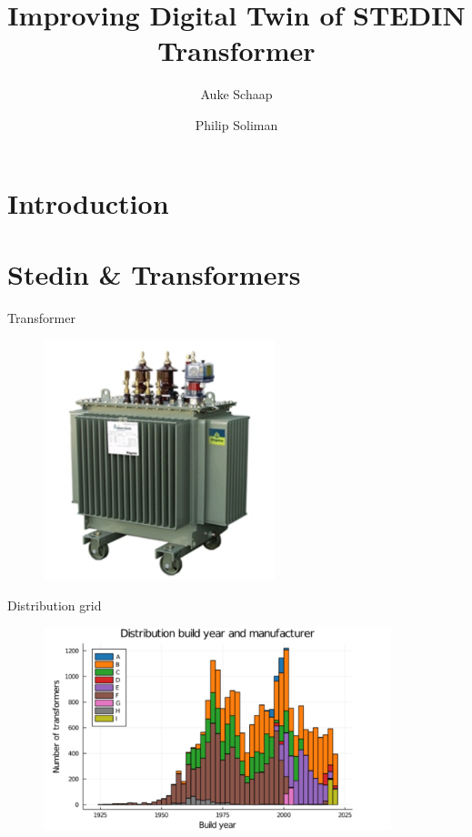 \documentclass[aspectratio=43]{beamer}
\title[]{Improving Digital Twin of STEDIN Transformer}
\institute[]{Delft University of Technology, The Netherlands}
\author{Auke Schaap \and Philip Soliman}
\date{}
\begin{document}
\section{Introduction}
{
\frame{\titlepage}
}

\section{Stedin & Transformers}
\begin{frame}[fragile]{Transformer} %
\begin{figure}
    \centering
    \includegraphics[width=0.6\textwidth]{figures/transformer.png}
    \label{fig:my_label}
\end{figure}
\end{frame}

\begin{frame}[fragile]{Distribution grid} %
\begin{figure}
    \centering
    \includegraphics[width=0.9\textwidth]{figures/stedin_transformers_build_year.png}
    \label{fig:my_label}
\end{figure}
\end{frame}
\end{document}
